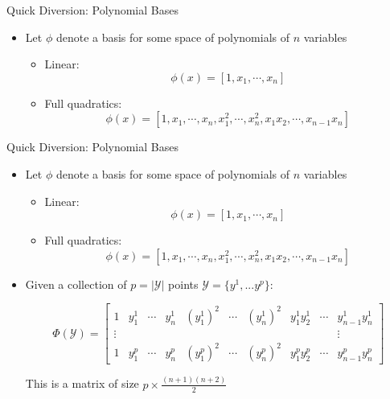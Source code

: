 \documentclass[handout,aspectratio=54]{beamer}
\numberwithin{theorem}{section}
\begin{document}
\begin{frame}{Quick Diversion: Polynomial Bases}
\begin{itemize}
\item Let $\phi$ denote a basis for some space of polynomials of $n$ variables
	\begin{itemize}
	\item Linear:
\begin{equation*}
\phi(x)=[1,x_1,\cdots,x_n]
\end{equation*}
	\item Full quadratics:
\begin{equation*}
\phi(x)=[1,x_1,\cdots,x_n,x_1^2,\cdots,x_n^2,x_1x_2,\cdots,x_{n-1}x_n]
\end{equation*}
	\end{itemize}
\end{itemize}
\vspace{4cm}
\end{frame}

\begin{frame}{Quick Diversion: Polynomial Bases}
\begin{itemize}
\item Let $\phi$ denote a basis for some space of polynomials of $n$ variables
	\begin{itemize}
	\item Linear:
\begin{equation*}
\phi(x)=[1,x_1,\cdots,x_n]
\end{equation*}
	\item Full quadratics:
\begin{equation*}
\phi(x)=[1,x_1,\cdots,x_n,x_1^2,\cdots,x_n^2,x_1x_2,\cdots,x_{n-1}x_n]
\end{equation*}
	\end{itemize}
\item Given a collection of $p=|\mathcal{Y}|$ points $\mathcal{Y}=\{y^1,...y^p\}$:

\begin{equation*}
\Phi(\mathcal{Y})=
\begin{bmatrix}
1 & y_1^1 & \cdots & y_n^1 &(y_1^1)^2 & \cdots & (y_n^1)^2 & y_1^1y_2^1 & \cdots & y_{n-1}^1y_n^1\\ 
\vdots&&&&&&&&&\vdots \\
1 & y_1^p & \cdots & y_n^p & (y_1^p)^2 & \cdots & (y_n^p)^2 & y_1^py_2^p & \cdots & y_{n-1}^py_n^p
\end{bmatrix}
\end{equation*}

This is a matrix of size $p\times\frac{(n+1)(n+2)}{2}$
\end{itemize}
\end{frame}
\end{document}
